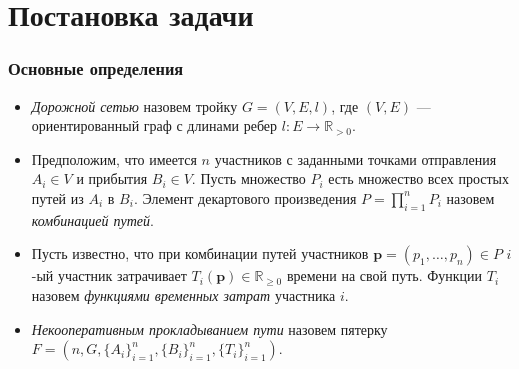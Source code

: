 \documentclass{beamer}
\begin{document}
\section{Постановка задачи}

\begin{frame}\frametitle{Основные определения}
  \begin{itemize}
	\item   \emph{Дорожной сетью} назовем тройку $G = (V, E, l)$, где $(V, E)$ --- ориентированный граф с длинами ребер $l: E \rightarrow \mathbb{R}_{>0} $.
	
	\item Предположим, что имеется $n$ участников с заданными точками отправления $A_i \in V$ и прибытия $B_i \in V$. Пусть множество $P_i$ есть множество всех простых путей из $A_i$ в $B_i$. Элемент декартового произведения ${P = \prod \limits_{i = 1} ^ n P_i}$ назовем \emph{комбинацией путей}.
	
	\item Пусть известно, что при комбинации путей участников $\textbf{p} = \left(p_1, \ldots, p_n\right)\in P$ $i$-ый участник затрачивает $T_i(\textbf{p}) \in \mathbb{R}_{\ge 0}$ времени на свой путь.  Функции $T_i$ назовем \textit{функциями временных затрат} участника $i$.
	
	\item \textit{Некооперативным прокладыванием пути} назовем пятерку $F=(n, G, \{A_i\}_{i = 1}^{n}, \{B_i\}_{i = 1}^{n}, \{T_i\}_{i = 1}^{n})$.
\end{itemize}
\end{frame}
\end{document}
